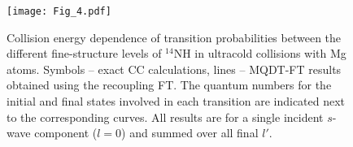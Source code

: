 \documentclass[reprint,amssymb,noeprint,twocolumn,longbibliography]{revtex4-2}
\begin{document}











\begin{figure}[t!]
\begin{center}
\texttt{[image: Fig\_4.pdf]}
\end{center}
\vspace{-0.2cm}
\caption{Collision energy dependence of transition probabilities between the different fine-structure levels of $^{14}$NH in ultracold collisions with Mg atoms. Symbols --  exact CC calculations, lines -- MQDT-FT results obtained using the recoupling FT. The quantum numbers for the initial and final states involved in each transition are indicated next to the corresponding curves. All results are for a single incident $s$-wave component ($l=0$) and summed over all final $l'$. 
}
\label{Fig_4}
\end{figure}
\end{document}
